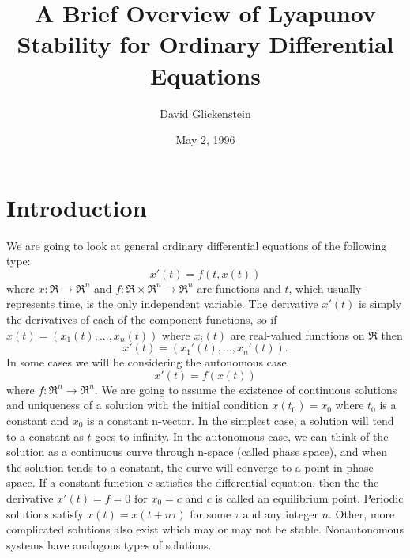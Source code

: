 \documentclass[12pt]{article}
\begin{document}
\newtheorem{dfn}{Definition}[section]
\newtheorem{eqn}{Equation}[section]
\newtheorem{lem}{Lemma}[section]
\newtheorem{thm}{Theorem}[section]
\newtheorem{cor}{Corollary}[section]

\title{A Brief Overview of Lyapunov Stability for Ordinary Differential Equations}
\author{David Glickenstein}
\date{May 2, 1996}
\maketitle


\section{Introduction}

We are going to look at general ordinary differential equations of the
following type:
\begin{equation}
	x'(t) = f(t,x(t))
	\label{gen}
\end{equation}
where $x: \Re \rightarrow \Re^n$ and $f:\Re \times \Re^n \rightarrow
\Re^n$ are functions and $t$, which usually represents time, is the
only independent variable.  The derivative $x'(t)$ is simply the
derivatives of each of the component functions, so if $x(t) =
(x_1(t),...,x_n(t))$ where $x_i(t)$ are real-valued functions on $\Re$
then
$$x'(t) = (x_1'(t),...,x_n'(t)).$$
In some cases we will be considering the autonomous case
\begin{equation}
	x'(t) = f(x(t))
	\label{aut}
\end{equation}
where $f:\Re^n \rightarrow \Re^n$.  We are going to assume the
existence of continuous solutions and uniqueness of a solution with
the initial condition $x(t_0) = x_0$ where $t_0$ is a constant and
$x_0$ is a constant n-vector.  In the simplest case, a solution will
tend to a constant as $t$ goes to infinity.  In the autonomous case,
we can think of the solution as a continuous curve through n-space
(called phase space), and when the solution tends to a constant, the
curve will converge to a point in phase space.  If a constant function
$c$ satisfies the differential equation, then the the derivative
$x'(t) = f = 0$ for $x_0 = c$ and $c$ is called an equilibrium point.
Periodic solutions satisfy $x(t) = x(t + n\tau)$ for some $\tau$ and
any integer $n$.  Other, more complicated solutions also exist which
may or may not be stable.  Nonautonomous systems have analogous types
of solutions.
\end{document}
